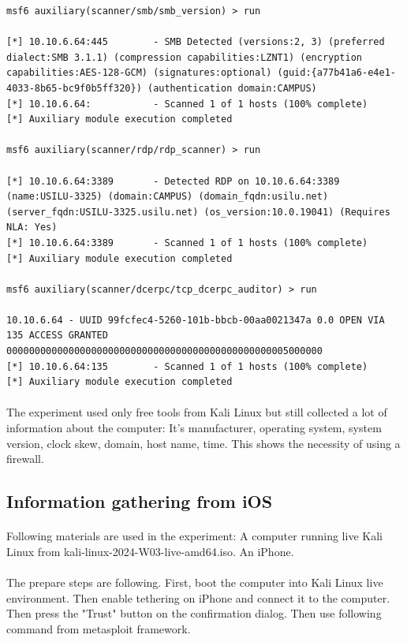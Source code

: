 \documentclass[mscthesis]{usiinfthesis}
\begin{document}
\begin{lstlisting}[language={},frame=single,breaklines=true,postbreak=\mbox{\textcolor{red}{$\hookrightarrow$}\space}]
msf6 auxiliary(scanner/smb/smb_version) > run

[*] 10.10.6.64:445        - SMB Detected (versions:2, 3) (preferred dialect:SMB 3.1.1) (compression capabilities:LZNT1) (encryption capabilities:AES-128-GCM) (signatures:optional) (guid:{a77b41a6-e4e1-4033-8b65-bc9f0b5ff320}) (authentication domain:CAMPUS)
[*] 10.10.6.64:           - Scanned 1 of 1 hosts (100% complete)
[*] Auxiliary module execution completed

msf6 auxiliary(scanner/rdp/rdp_scanner) > run

[*] 10.10.6.64:3389       - Detected RDP on 10.10.6.64:3389       (name:USILU-3325) (domain:CAMPUS) (domain_fqdn:usilu.net) (server_fqdn:USILU-3325.usilu.net) (os_version:10.0.19041) (Requires NLA: Yes)
[*] 10.10.6.64:3389       - Scanned 1 of 1 hosts (100% complete)
[*] Auxiliary module execution completed

msf6 auxiliary(scanner/dcerpc/tcp_dcerpc_auditor) > run

10.10.6.64 - UUID 99fcfec4-5260-101b-bbcb-00aa0021347a 0.0 OPEN VIA 135 ACCESS GRANTED 00000000000000000000000000000000000000000000000005000000
[*] 10.10.6.64:135        - Scanned 1 of 1 hosts (100% complete)
[*] Auxiliary module execution completed
\end{lstlisting}
\paragraph{}
The experiment used only free tools from Kali Linux but still collected a lot of information about the computer: It's manufacturer, operating system, system version, clock skew, domain, host name, time. This shows the necessity of using a firewall.

\subsection{Information gathering from iOS}
\paragraph{}
Following materials are used in the experiment: A computer running live Kali Linux from kali-linux-2024-W03-live-amd64.iso. An iPhone.
\paragraph{}
The prepare steps are following. First, boot the computer into Kali Linux live environment. Then enable tethering on iPhone and connect it to the computer. Then press the "Trust" button on the confirmation dialog. Then use following command from metasploit framework.
\end{document}
